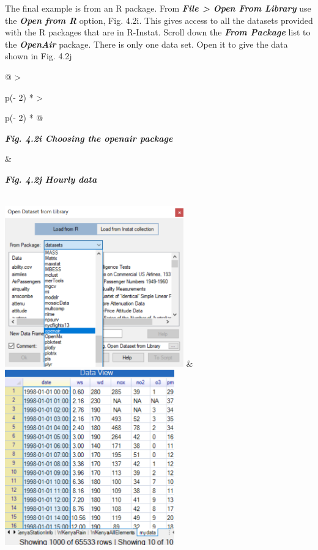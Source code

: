 \documentclass[
  letterpaper,
  DIV=11,
  numbers=noendperiod]{scrreprt}
\begin{document}
The final example is from an R package. From \textbf{\emph{File
\textgreater{} Open From Library}} use the \textbf{\emph{Open from R}}
option, Fig. 4.2i. This gives access to all the datasets provided with
the R packages that are in R-Instat. Scroll down the \textbf{\emph{From
Package}} list to the \textbf{\emph{OpenAir}} package. There is only one
data set. Open it to give the data shown in Fig. 4.2j

\begin{longtable}[]{@{}
  >{\raggedright\arraybackslash}p{(\columnwidth - 2\tabcolsep) * }
  >{\raggedright\arraybackslash}p{(\columnwidth - 2\tabcolsep) * }@{}}
\toprule\noalign{}
\begin{minipage}[b]{\linewidth}\raggedright
\textbf{\emph{Fig. 4.2i Choosing the openair package}}
\end{minipage} & \begin{minipage}[b]{\linewidth}\raggedright
\textbf{\emph{Fig. 4.2j Hourly data}}
\end{minipage} \\
\midrule\noalign{}
\endhead
\bottomrule\noalign{}
\endlastfoot
\includegraphics[width=3.0401in,height=2.73756in]{figures/Fig4.2i.png} &
\includegraphics[width=2.88612in,height=2.9989in]{figures/Fig4.2j.png} \\
\end{longtable}
\end{document}
